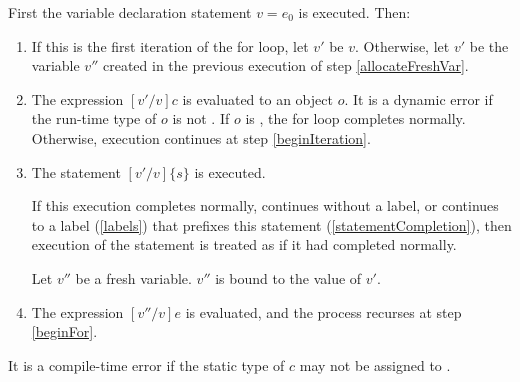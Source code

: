 \documentclass[makeidx]{article}
\begin{document}
{\LMHash{}%
First the variable declaration statement \VAR{} $v = e_0$ is executed.
Then:
\begin{enumerate}
\item
\label{beginFor}
If this is the first iteration of the for loop, let $v'$ be $v$.
Otherwise, let $v'$ be the variable $v''$ created in the previous execution of step \ref{allocateFreshVar}.
\item
The expression $[v'/v]c$ is evaluated to an object $o$.
It is a dynamic error if the run-time type of $o$ is not .
If $o$ is \FALSE{}, the for loop completes normally.
Otherwise, execution continues at step \ref{beginIteration}.
\item
\label{beginIteration}
The statement $[v'/v]\{s\}$ is executed.

If this execution completes normally, continues without a label,
or continues to a label (\ref{labels}) that prefixes this \FOR{} statement (\ref{statementCompletion}),
then execution of the statement is treated as if it had completed normally.

\label{allocateFreshVar}
Let $v''$ be a fresh variable.
$v''$ is bound to the value of $v'$.
\item
The expression $[v''/v]e$ is evaluated, and the process recurses at step \ref{beginFor}.
\end{enumerate}


\LMHash{}%
It is a compile-time error if the static type of $c$ may not be assigned to .



}
\end{document}
